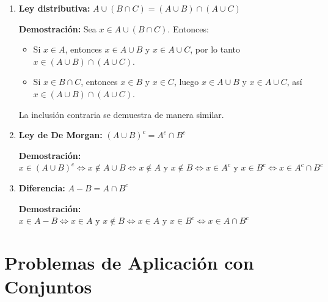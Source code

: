 \documentclass[12pt,a4paper]{article}
\begin{document}
\begin{enumerate}
    \item \textbf{Ley distributiva:} $A \cup (B \cap C) = (A \cup B) \cap (A \cup C)$
    
    \textbf{Demostración:} Sea $x \in A \cup (B \cap C)$. Entonces:
    \begin{itemize}
        \item Si $x \in A$, entonces $x \in A \cup B$ y $x \in A \cup C$, por lo tanto $x \in (A \cup B) \cap (A \cup C)$.
        \item Si $x \in B \cap C$, entonces $x \in B$ y $x \in C$, luego $x \in A \cup B$ y $x \in A \cup C$, así $x \in (A \cup B) \cap (A \cup C)$.
    \end{itemize}
    La inclusión contraria se demuestra de manera similar.
    
    \item \textbf{Ley de De Morgan:} $(A \cup B)^c = A^c \cap B^c$
    
    \textbf{Demostración:} $x \in (A \cup B)^c \Leftrightarrow x \notin A \cup B \Leftrightarrow x \notin A \text{ y } x \notin B \Leftrightarrow x \in A^c \text{ y } x \in B^c \Leftrightarrow x \in A^c \cap B^c$
    
    \item \textbf{Diferencia:} $A - B = A \cap B^c$
    
    \textbf{Demostración:} $x \in A - B \Leftrightarrow x \in A \text{ y } x \notin B \Leftrightarrow x \in A \text{ y } x \in B^c \Leftrightarrow x \in A \cap B^c$
\end{enumerate}

\section{Problemas de Aplicación con Conjuntos}
\end{document}
